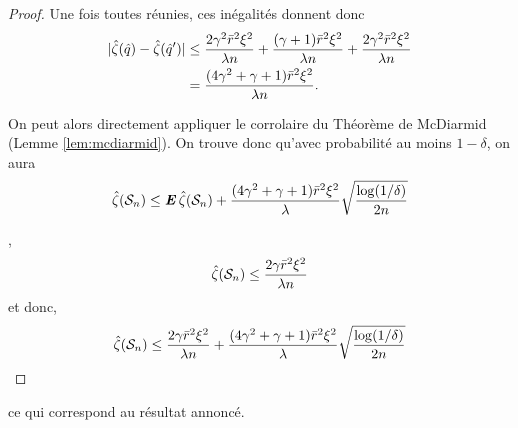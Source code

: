 \begin{proof}
  Une fois toutes réunies, ces inégalités donnent donc
  \begin{align}
    |\hat\zeta(\hat q) - \hat\zeta(\hat q')| &\leq \frac{2\gamma^2\bar r^2\xi^2}{\lambda n} + \frac{(\gamma+1)\bar r^2\xi^2}{\lambda n}
                                 + \frac{2\gamma^2\bar r^2\xi^2}{\lambda n}\\
                               & = \frac{(4\gamma^2 + \gamma + 1)\bar r^2\xi^2}{\lambda n}.
  \end{align}

  On peut alors directement appliquer le corrolaire du Théorème de McDiarmid (Lemme
  \ref{lem:mcdiarmid}). On trouve donc qu'avec probabilité au moins $1-\delta$, on aura
  \begin{equation}
    \hat\zeta(\mathcal S_n) \leq \operatorname{\mbox{\textbf{\textit{E}}}}\hat\zeta(\mathcal S_n) + \frac{(4\gamma^2 + \gamma +
      1)\bar r^2\xi^2}{\lambda}\sqrt{\frac{\log(1/\delta)}{2n}} 
  \end{equation}

  ,
  \begin{equation}
    \hat\zeta(\mathcal S_n) \leq \frac{2\gamma\bar r^2\xi^2}{\lambda n}
  \end{equation}
  et donc,
  \begin{equation}
    \hat\zeta(\mathcal S_n) \leq \frac{2\gamma\bar r^2\xi^2}{\lambda n} + \frac{(4\gamma^2 + \gamma +
        1)\bar r^2\xi^2}{\lambda}\sqrt{\frac{\log(1/\delta)}{2n}}
  \end{equation}
\end{proof}
ce qui correspond au résultat annoncé.





